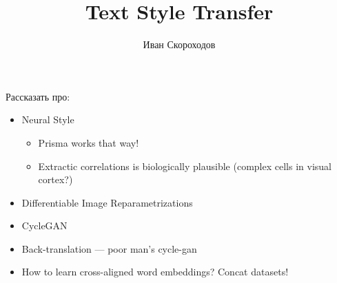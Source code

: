\documentclass{article}
\title{Text Style Transfer}
\author{Иван Скороходов}
\date{}
\begin{document}
\maketitle

Рассказать про:
\begin{itemize}
    \item Neural Style
    \begin{itemize}
        \item Prisma works that way!
        \item Extractic correlations is biologically plausible (complex cells in visual cortex?)
    \end{itemize}
    \item Differentiable Image Reparametrizations
    \item CycleGAN
    \item Back-translation — poor man's cycle-gan
    \item How to learn cross-aligned word embeddings? Concat datasets!
\end{itemize}
\end{document}
